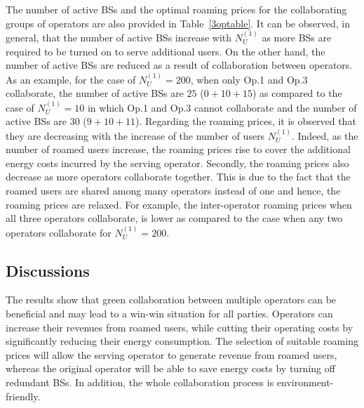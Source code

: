 \documentclass[10pt, letter, twocolumn]{IEEEtran}
\begin{document}
The number of active BSs and the optimal roaming prices for the collaborating groups of operators are also provided in Table~\ref{3optable}. It can be observed, in general, that the number of active BSs increase with $N_{U}^{(1)}$ as more BSs are required to be turned on to serve additional users. On the other hand, the number of active BSs are reduced as a result of collaboration between operators. As an example, for the case of $N_{U}^{(1)} = 200$, when only Op.1 and Op.3 collaborate, the number of active BSs are $25$ ($0+10+15$) as compared to the case of $N_{U}^{(1)} = 10$ in which Op.1 and Op.3 cannot collaborate and the number of active BSs are 30 ($9+10+11$). Regarding the roaming prices, it is observed that they are decreasing with the increase of the number of users $N_{U}^{(1)}$. Indeed, as the number of roamed users increase, the roaming prices rise to cover the additional energy costs incurred by the serving operator. Secondly, the roaming prices also decrease as more operators collaborate together. This is due to the fact that the roamed users are shared among many operators instead of one and hence, the roaming prices are relaxed. For example, the inter-operator roaming prices when all three operators collaborate, is lower as compared to the case when any two operators collaborate for $N_{U}^{(1)}=200$.

\subsection{Discussions}
The results show that green collaboration between multiple operators can be beneficial and may lead to a win-win situation for all parties. Operators can increase their revenues from roamed users, while cutting their operating costs by significantly reducing their energy consumption. The selection of suitable roaming prices will allow the serving operator to generate revenue from roamed users, whereas the original operator will be able to save energy costs by turning off redundant BSs. In addition, the whole collaboration process is environment-friendly.
\end{document}
